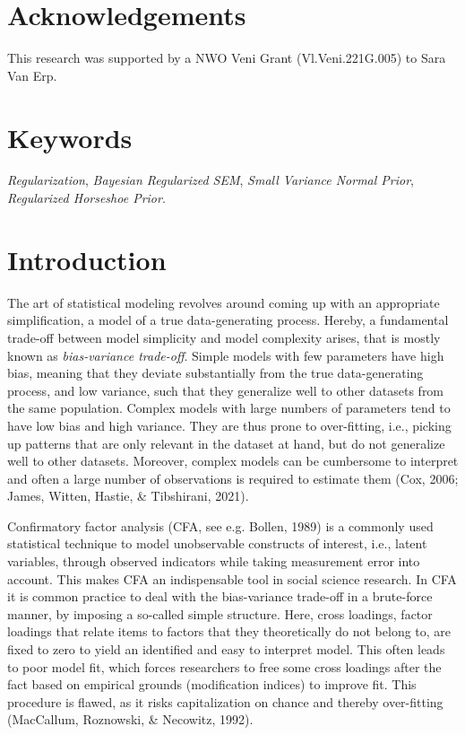 \documentclass[
  man, donotrepeattitle,floatsintext]{apa6}
\begin{document}
\vfill

\section{Acknowledgements}\label{acknowledgements}

This research was supported by a NWO Veni Grant (Vl.Veni.221G.005) to Sara Van Erp.

\section{Keywords}\label{keywords}

\emph{Regularization}, \emph{Bayesian Regularized SEM}, \emph{Small Variance Normal
Prior}, \emph{Regularized Horseshoe Prior}.

\clearpage

\setcounter{secnumdepth}{5}

\section{Introduction}\label{introduction}

The art of statistical modeling revolves around coming up with an
appropriate simplification, a model of a true data-generating process.
Hereby, a fundamental trade-off between model simplicity and model
complexity arises, that is mostly known as \emph{bias-variance trade-off}.
Simple models with few parameters have high bias, meaning that they
deviate substantially from the true data-generating process, and low
variance, such that they generalize well to other datasets from the same
population. Complex models with large numbers of parameters tend to have
low bias and high variance. They are thus prone to over-fitting, i.e.,
picking up patterns that are only relevant in the dataset at hand, but
do not generalize well to other datasets. Moreover, complex models can
be cumbersome to interpret and often a large number of observations is
required to estimate them (Cox, 2006; James, Witten, Hastie, \& Tibshirani, 2021).

Confirmatory factor analysis (CFA, see e.g. Bollen, 1989) is
a commonly used statistical technique to model unobservable
constructs of interest, i.e., latent variables, through observed
indicators while taking measurement error into account. This makes CFA
an indispensable tool in social science research. In CFA it is common
practice to deal with the bias-variance trade-off in a brute-force
manner, by imposing a so-called simple structure. Here, cross loadings,
factor loadings that relate items to factors that they theoretically do
not belong to, are fixed to zero to yield an identified and easy to
interpret model. This often leads to poor model fit, which forces
researchers to free some cross loadings after the fact based on
empirical grounds (modification indices) to improve fit. This procedure
is flawed, as it risks capitalization on chance and thereby over-fitting
(MacCallum, Roznowski, \& Necowitz, 1992).
\end{document}
